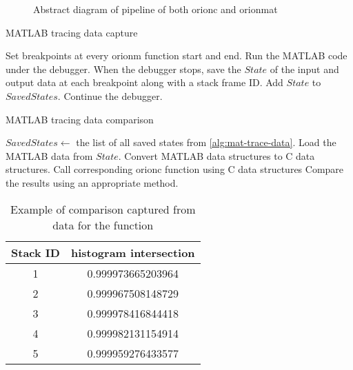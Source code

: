 \begin{figure}
	\centering
	\resizebox{0.8\linewidth}{!}{}
	\caption{Abstract diagram of pipeline of both \gls{orionc}
		and \gls{orionmat}}\label{fig:abs-pipe}
\end{figure}

\begin{algorithm}
	\caption{MATLAB tracing data capture}\label{alg:mat-trace-data}
	\begin{algorithmic}[1]
		\State Set breakpoints at every \gls{orionm} function start and end.
		\State Run the MATLAB code under the debugger.
			\State When the debugger stops, save the $State$ of the input and output data at
				each breakpoint along with a stack frame
				ID. Add $State$ to $SavedStates$.
			\State Continue the debugger.
		\EndWhile
	\end{algorithmic}
\end{algorithm}

\begin{algorithm}
	\caption{MATLAB tracing data comparison}\label{alg:mat-trace-compare}
	\begin{algorithmic}[1]
		\State \Input $SavedStates \gets$ the list of all saved
		states from \cref{alg:mat-trace-data}.
			\State Load the MATLAB data from $State$.
			\State Convert MATLAB data structures to C
			data structures.
			\State Call corresponding \gls{orionc}
				function using C data structures
			\State Compare the results using an
				appropriate method.
		\EndFor
	\end{algorithmic}
\end{algorithm}

\begin{table}
	\centering
	\begin{tabular}{cc}
		\toprule
		\be{}Stack ID     & \be{} histogram intersection \\
		\midrule
		1 & 0.999973665203964 \\
		2 & 0.999967508148729 \\
		3 & 0.999978416844418 \\
		4 & 0.999982131154914 \\
		5 & 0.999959276433577 \\
		\bottomrule
	\end{tabular}
	\caption{Example of comparison captured from data for the
		 function}\label{tbl:compare-Makefilter}
\end{table}


